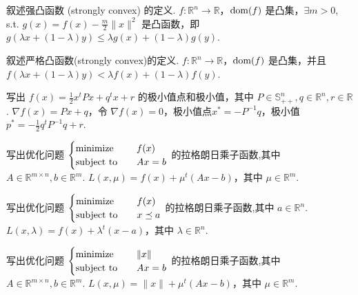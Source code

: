 \begin{problem}[问答]
    叙述强凸函数 (strongly convex) 的定义.
    \Answer $f:\mathbb{R}^n \to \mathbb{R}$，$\operatorname{dom}(f)$ 是凸集，$\exists m > 0$, s.t. $g(x) = f(x) - \frac{m}{2}\|x\|^2$ 是凸函数，即 $g(\lambda x + (1 - \lambda)y) \le \lambda g(x) + (1 - \lambda)g(y)$.
\end{problem}

\begin{problem}[问答]
    叙述严格凸函数(strongly convex)的定义.
    \Answer $f:\mathbb{R}^n \to \mathbb{R}$，$\operatorname{dom}(f)$ 是凸集，并且 $f(\lambda x + (1 - \lambda)y) < \lambda f(x) + (1 - \lambda)f(y)$.
\end{problem}

\begin{problem}[问答]
    写出 $f(x) = \frac{1}{2}x^tPx + q^tx + r$ 的极小值点和极小值，其中 $P \in \mathbb{S}_{++}^n, q \in \mathbb{R}^n, r \in \mathbb{R}$.
    \Answer $\nabla f(x) = Px + q$，令 $\nabla f(x) = 0$，极小值点$x^* = -P^{-1}q$，极小值 $p^* = -\frac{1}{2}q^tP^{-1}q + r$.
\end{problem}

\begin{problem}[问答]
    写出优化问题 $\begin{cases}
        \operatorname{minimize} \quad &f(x)\\
        \operatorname{subject\ to} \quad &Ax = b
    \end{cases}$ 的拉格朗日乘子函数,其中 $A \in \mathbb{R}^{m \times n}, b \in \mathbb{R}^m$.
    \Answer $L(x, \mu) = f(x) + \mu^t(Ax - b)$，其中 $\mu \in \mathbb{R}^m$.
\end{problem}

\begin{problem}[问答]
    写出优化问题 $\begin{cases}
        \operatorname{minimize} \quad &f(x)\\
        \operatorname{subject\ to} \quad &x \preceq a
    \end{cases}$ 的拉格朗日乘子函数,其中 $a \in \mathbb{R}^n$.
    \Answer $L(x, \lambda) = f(x) + \lambda^t(x - a)$，其中 $\lambda \in \mathbb{R}^n$.
\end{problem}

\begin{problem}[问答]
    写出优化问题 $\begin{cases}
        \operatorname{minimize} \quad &\|x\| \\
        \operatorname{subject\ to} \quad &Ax = b
    \end{cases}$ 的拉格朗日乘子函数,其中 $A \in \mathbb{R}^{m \times n}, b \in \mathbb{R}^m$.
    \Answer $L(x, \mu) = \|x\| + \mu^t(Ax - b)$，其中 $\mu \in \mathbb{R}^m$.
\end{problem}

